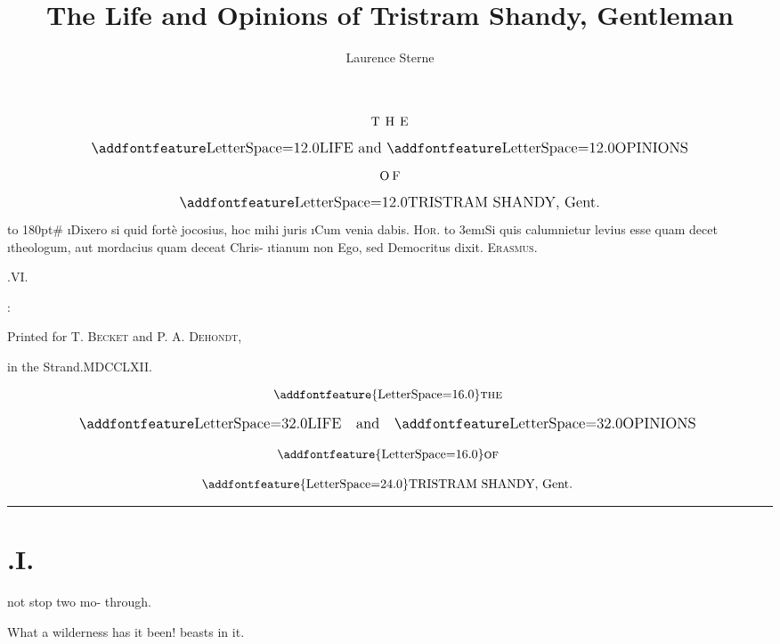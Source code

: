 \documentclass[twoside]{article}
\title{The Life and Opinions of Tristram Shandy, Gentleman}
\author{Laurence Sterne}
\begin{document}
\pagestyle{empty}
\null
\vfill
$$\vbox{\openup 10pt\halign{\hss #\hss\cr
\hbox to 3em{T H E}\cr
\large \ls{LIFE} and \ls{OPINIONS}\cr
\hbox to 1.6em{O F}\cr
\large \ls{TRISTRAM SHANDY}, Gent.\cr
}}$$
\vfill
\newpage
\null
\newpage %
\vbox{\openup 10pt}
\vfill
\vbox{\openup -2pt\halign to 180pt{\footnotesize #\cr
\i{Dixero si quid fortè jocosius, hoc mihi juris}\hfill\cr
\i{Cum venia dabis}. \hfill \textsc{Hor.}\cr
\noalign{\vskip 4pt}
\hbox to 3em{\tsh}\i{Si quis calumnietur levius esse quam decet}\cr
\quad\i{theologum, aut mordacius quam deceat Chris-}\cr
\quad\i{tianum \tsh non Ego, sed Democritus dixit}.\tsh\cr
\hfill\textsc{Erasmus}.\cr}}
\vfill
\centerline{.\quad VI.}
\vfill
\centerline{:}
\centerline{\small Printed for T. \textsc{Becket} and P. A. \textsc{Dehondt},}
\centerline{\small in the Strand.\quad MDCCLXII.}

\newpage
\null
\newpage
\pagestyle{fancy}
\thispagestyle{empty}
\setcounter{page}{1}
\hbox{}\vskip -36pt

\[\vbox{\openup 12pt\halign{\hss # \hss\cr
\addfontfeature{LetterSpace=16.0}\textsc{the}\cr
\large\lsss{LIFE}\quad and\quad \lsss{OPINIONS}\cr
\addfontfeature{LetterSpace=16.0}\textsc{of}\cr
{\addfontfeature{LetterSpace=24.0}TRISTRAM SHANDY}, Gent.\cr}}\]

\vskip 12pt
\hrule

\bigskip
\setlength{\baselineskip}{14pt}  %
\sloppy

\section{.\enspace I.}

 not stop two mo-\break
{}\break
{}
through.\tsh

\tsh What a wilderness has it been!\break
{}
beasts in it.
\end{document}
